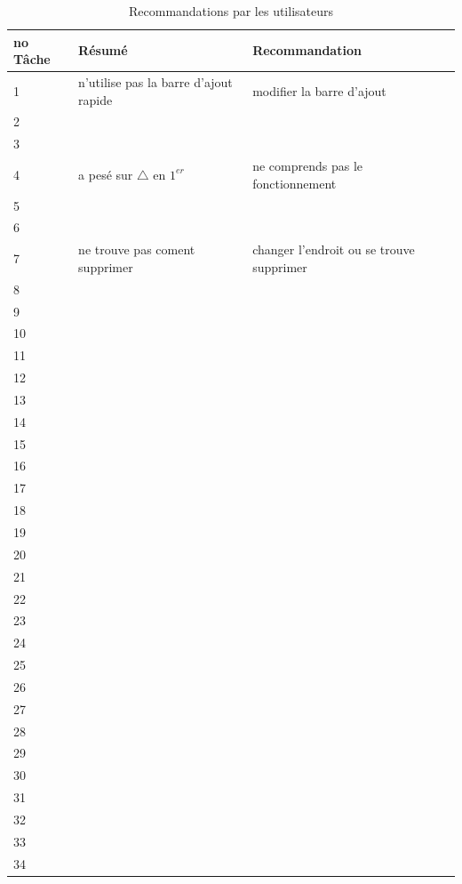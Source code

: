 \documentclass[letterpaper, oneside, 12pt, these, creativecommons]{thETS}
\begin{document}
\newpage

\begin{table}
	\centering
	\begin{tabular}{|l|l|l|}
	\hline
	no Tâche	& Résumé	& Recommandation 	\\ \hline
	1		&  n'utilise pas la barre d'ajout rapide		&  modifier la barre d'ajout						\\ \hline
	2		& 							&  									\\ \hline
	3		& 							&  									\\ \hline
	4		&  a pesé sur	$\bigtriangleup$ en $1^{er}$	&  ne comprends pas le fonctionnement				\\ \hline
	5		& 							&  									\\ \hline
	6		& 							&  									\\ \hline
	7		& ne trouve pas coment supprimer		&  changer l'endroit ou se trouve supprimer			\\ \hline
	8		& 							&  									\\ \hline
	9		& 							&  									\\ \hline
	10		& 							&  									\\ \hline
	11		& 							&  									\\ \hline
	12		& 							&  									\\ \hline
	13		& 							&  									\\ \hline
	14		& 							&  									\\ \hline
	15		& 							&  									\\ \hline
	16		&							&  									\\ \hline
	17		& 							&  									\\ \hline
	18		& 							&  									\\ \hline
	19		& 							&  									\\ \hline
	20		& 							&  									\\ \hline
	21		& 							&  									\\ \hline
	22		& 							&  									\\ \hline
	23		& 							&  									\\ \hline
	24		& 							&  									\\ \hline
	25		& 							&  									\\ \hline
	26		& 							&  									\\ \hline
	27		& 							&  									\\ \hline
	28		& 							&  									\\ \hline
	29		& 							&  									\\ \hline
	30		& 							&  									\\ \hline
	31		& 							&  									\\ \hline
	32		& 							&  									\\ \hline
	33		& 							&  									\\ \hline
	34		& 							&  									\\ \hline
	\end{tabular}
	\caption{Recommandations par les utilisateurs}
\end{table}
\end{document}
